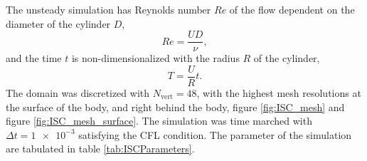 The unsteady simulation has Reynolds number $Re$ of the flow dependent on the diameter of the cylinder $D$,
	\begin{equation}
	Re = \frac{UD}{\nu},
	\end{equation}
and the time $t$ is non-dimensionalized with the radius $R$ of the cylinder,
	\begin{equation}
	T = \frac{U}{R}t.
	\end{equation}
The domain was discretized with $N_{\mathrm{vert}}=48$, with the highest mesh resolutions at the surface of the body, and right behind the body, figure \ref{fig:ISC_mesh} and figure \ref{fig:ISC_mesh_surface}. The simulation was time marched with $\Delta t = \num{1e-3}$ satisfying the CFL condition. The parameter of the simulation are tabulated in table \ref{tab:ISCParameters}.

